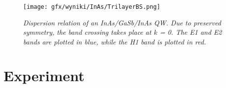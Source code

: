 \documentclass[titlepage,a4paper]{book}
\begin{document}
\begin{figure}[H]
	\centering
	\texttt{[image: gfx/wyniki/InAs/TrilayerBS.png]}
	\vspace{-10pt}
	\caption{\textit{Dispersion relation of an InAs/GaSb/InAs QW. Due to preserved symmetry, the band crossing takes place at $k$ = 0. The E1 and E2 bands are plotted in blue, while the H1 band is plotted in red.}}
	\label{fig:TrilayerBandStructure2}
\end{figure} 








\section{Experiment}
\end{document}
